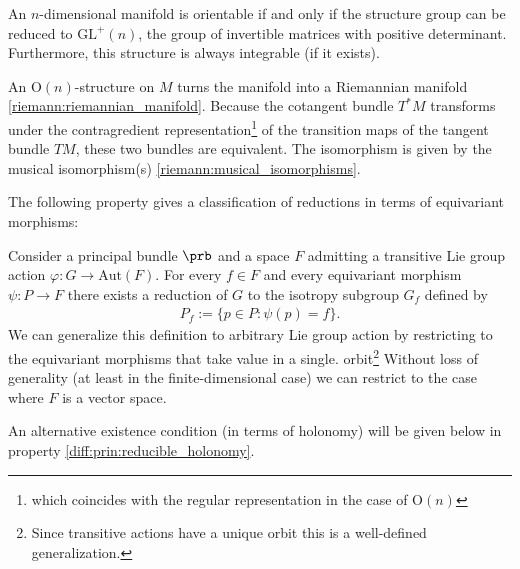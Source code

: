 
    \begin{example}\label{diff:orientable_structure}
        An $n$-dimensional manifold is orientable if and only if the structure group can be reduced to $\text{GL}^+(n)$, the group of invertible matrices with positive determinant. Furthermore, this structure is always integrable (if it exists).
    \end{example}
    \begin{example}
        An $\text{O}(n)$-structure on $M$ turns the manifold into a Riemannian manifold \ref{riemann:riemannian_manifold}. Because the cotangent bundle $T^*M$ transforms under the contragredient representation\footnote{which coincides with the regular representation in the case of $\text{O}(n)$} of the transition maps of the tangent bundle $TM$, these two bundles are equivalent. The isomorphism is given by the musical isomorphism(s) \ref{riemann:musical_isomorphisms}.
    \end{example}

    The following property gives a classification of reductions in terms of equivariant morphisms:
    \begin{property}\label{diff:prin:reduction_classification}
        Consider a principal bundle $\prb$ and a space $F$ admitting a transitive Lie group action $\varphi:G\rightarrow\text{Aut}(F)$. For every $f\in F$ and
        every equivariant morphism $\psi:P\rightarrow F$ there exists a reduction of $G$ to the isotropy subgroup $G_f$ defined by
        \begin{gather}
            P_f := \{p\in P:\psi(p) = f\}.
        \end{gather}
        We can generalize this definition to arbitrary Lie group action by restricting to the equivariant morphisms that take value in a single. orbit\footnote{Since transitive actions have a unique orbit this is a well-defined generalization.} Without loss of generality (at least in the finite-dimensional case) we can restrict to the case where $F$ is a vector space.
    \end{property}
    An alternative existence condition (in terms of holonomy) will be given below in property \ref{diff:prin:reducible_holonomy}.

